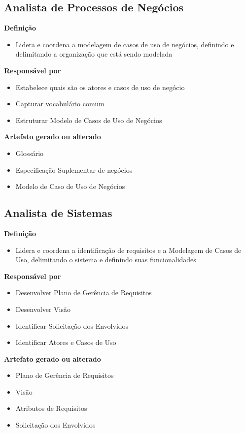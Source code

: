 \subsection{Analista de Processos de Negócios}

\textbf{Definição}
\begin{itemize}
\item Lidera e coordena a modelagem de casos de uso de negócios, definindo e delimitando a organização que está sendo modelada
\end{itemize}

\textbf{Responsável por}
\begin{itemize}
\item Estabelece quais são os atores e casos de uso de negócio
\item Capturar vocabulário comum
\item Estruturar Modelo de Casos de Uso de Negócios
\end{itemize}

\textbf{Artefato gerado ou alterado}
\begin{itemize}
\item Glossário
\item Especificação Suplementar de negócios
\item Modelo de Caso de Uso de Negócios
\end{itemize}

\subsection{Analista de Sistemas}

\textbf{Definição}
\begin{itemize}
\item Lidera e coordena a identificação de requisitos e a Modelagem de Casos de Uso, delimitando o sistema e definindo suas funcionalidades
\end{itemize}

\textbf{Responsável por}
\begin{itemize}
\item Desenvolver Plano de Gerência de Requisitos
\item Desenvolver Visão
\item Identificar Solicitação dos Envolvidos
\item Identificar Atores e Casos de Uso
\end{itemize}

\textbf{Artefato gerado ou alterado}
\begin{itemize}
\item Plano de Gerência de Requisitos
\item Visão
\item Atributos de Requisitos
\item Solicitação dos Envolvidos
\end{itemize}

